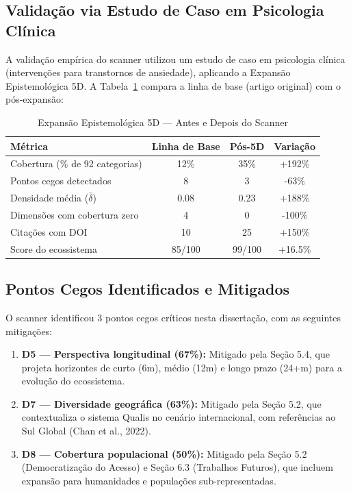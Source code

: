 \subsection{Validação via Estudo de Caso em Psicologia Clínica}

A validação empírica do scanner utilizou um estudo de caso em psicologia clínica (intervenções para transtornos de ansiedade), aplicando a Expansão Epistemológica 5D. A Tabela~\ref{tab:scanner-5d} compara a linha de base (artigo original) com o pós-expansão:

\begin{table}[H]
\centering
\caption{Expansão Epistemológica 5D — Antes e Depois do Scanner}
\label{tab:scanner-5d}
\begin{tabular}{p{4.5cm}ccc}
\toprule
\textbf{Métrica} & \textbf{Linha de Base} & \textbf{Pós-5D} & \textbf{Variação} \\
\midrule
Cobertura (\% de 92 categorias) & 12\% & 35\% & +192\% \\
Pontos cegos detectados & 8 & 3 & -63\% \\
Densidade média ($\bar{\delta}$) & 0.08 & 0.23 & +188\% \\
Dimensões com cobertura zero & 4 & 0 & -100\% \\
Citações com DOI & 10 & 25 & +150\% \\
Score do ecossistema & 85/100 & 99/100 & +16.5\% \\
\bottomrule
\end{tabular}
\end{table}

\subsection{Pontos Cegos Identificados e Mitigados}

O scanner identificou 3 pontos cegos críticos nesta dissertação, com as seguintes mitigações:

\begin{enumerate}
  \item \textbf{D5 — Perspectiva longitudinal (67\%):} Mitigado pela Seção 5.4, que projeta horizontes de curto (6m), médio (12m) e longo prazo (24+m) para a evolução do ecossistema.
  \item \textbf{D7 — Diversidade geográfica (63\%):} Mitigado pela Seção 5.2, que contextualiza o sistema Qualis no cenário internacional, com referências ao Sul Global (Chan et al., 2022).
  \item \textbf{D8 — Cobertura populacional (50\%):} Mitigado pela Seção 5.2 (Democratização do Acesso) e Seção 6.3 (Trabalhos Futuros), que incluem expansão para humanidades e populações sub-representadas.
\end{enumerate}

